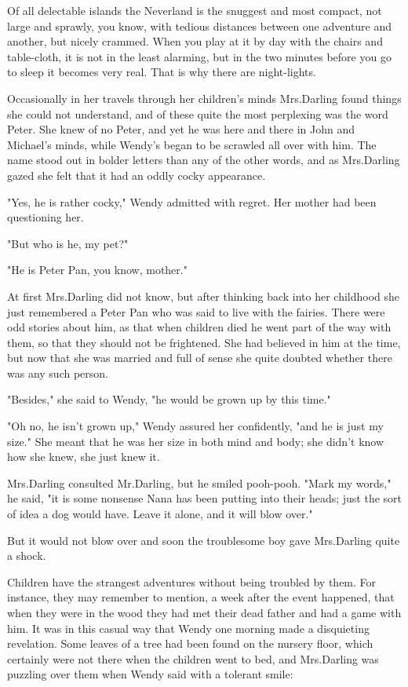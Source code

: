 Of all delectable islands the Neverland is the snuggest and most compact,
not large and sprawly, you know, with tedious distances between one adventure and another,
but nicely crammed.
When you play at it by day with the chairs and table-cloth, it is not in the least alarming,
but in the two minutes before you go to sleep it becomes very real.
That is why there are night-lights.

Occasionally in her travels through her children's minds Mrs.\@ Darling found things she could not understand,
and of these quite the most perplexing was the word Peter.
She knew of no Peter, and yet he was here and there in John and Michael's minds,
while Wendy's began to be scrawled all over with him.
The name stood out in bolder letters than any of the other words,
and as Mrs.\@ Darling gazed she felt that it had an oddly cocky appearance.

"Yes, he is rather cocky," Wendy admitted with regret.
Her mother had been questioning her.

"But who is he, my pet?"

"He is Peter Pan, you know, mother."

At first Mrs.\@ Darling did not know,
but after thinking back into her childhood she just remembered a Peter Pan who was said to live with the fairies.
There were odd stories about him,
as that when children died he went part of the way with them, so that they should not be frightened.
She had believed in him at the time,
but now that she was married and full of sense she quite doubted whether there was any such person.

"Besides," she said to Wendy, "he would be grown up by this time."

"Oh no, he isn't grown up," Wendy assured her confidently, "and he is just my size."
She meant that he was her size in both mind and body;
she didn't know how she knew, she just knew it.

Mrs.\@ Darling consulted Mr.\@ Darling, but he smiled pooh-pooh.
"Mark my words," he said, "it is some nonsense Nana has been putting into their heads;
just the sort of idea a dog would have.
Leave it alone, and it will blow over."

But it would not blow over and soon the troublesome boy gave Mrs.\@ Darling quite a shock.

Children have the strangest adventures without being troubled by them.
For instance, they may remember to mention, a week after the event happened,
that when they were in the wood they had met their dead father and had a game with him.
It was in this casual way that Wendy one morning made a disquieting revelation.
Some leaves of a tree had been found on the nursery floor,
which certainly were not there when the children went to bed,
and Mrs.\@ Darling was puzzling over them when Wendy said with a tolerant smile:

